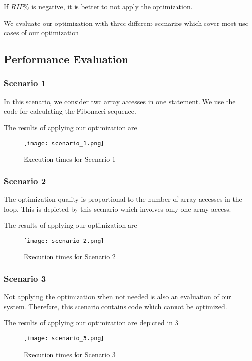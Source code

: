 If  $RIP\%$ is negative,  it is better to not apply the optimization.

We evaluate our optimization with three different scenarios which cover most use cases of our optimization

\subsection{Performance Evaluation}

\subsubsection{Scenario 1}

In this scenario, we consider two array accesses in one statement. We use the code for calculating the Fibonacci sequence.

The results of applying our optimization are

\begin{figure}[H]
	\texttt{[image: scenario\_1.png]}
	\caption{Execution times for Scenario 1}
	\label{TC_1}	
\end{figure}

\subsubsection{Scenario 2}

The optimization quality is proportional to the number of array accesses in the loop. This is depicted by this scenario which involves only one array access. 

The results of applying our optimization are

\begin{figure}[H]
	\centering
	\texttt{[image: scenario\_2.png]}
	\caption{Execution times for Scenario 2}
	\label{TC_2}	
\end{figure}

\subsubsection{Scenario 3}

Not applying the optimization when not needed is also an evaluation of our system. Therefore, this scenario contains code which cannot be optimized.

The results of applying our optimization are depicted in \ref{TC_3}

\begin{figure}[H]
	\centering
	\texttt{[image: scenario\_3.png]}
	\caption{Execution times for Scenario 3}
	\label{TC_3}	
\end{figure}

